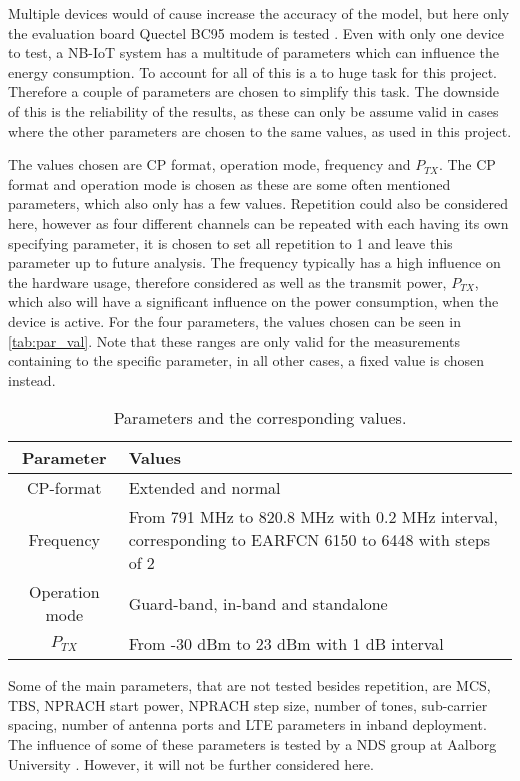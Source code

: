 Multiple devices would of cause increase the accuracy of the model, but here only the evaluation board Quectel BC95 modem is tested \citep{BC95}. Even with only one device to test, a \gls{NB-IoT} system has a multitude of parameters which can influence the energy consumption. To account for all of this is a to huge task for this project. Therefore a couple of parameters are chosen to simplify this task. The downside of this is the reliability of the results, as these can only be assume valid in cases where the other parameters are chosen to the same values, as used in this project. 

The values chosen are CP format, operation mode, frequency and $P_{TX}$. The CP format and operation mode is chosen as these are some often mentioned parameters, which also only has a few values. Repetition could also be considered here, however as four different channels can be repeated with each having its own specifying parameter, it is chosen to set all repetition to 1 and leave this parameter up to future analysis. The frequency typically has a high influence on the hardware usage, therefore considered as well as the transmit power, $P_{TX}$, which also will have a significant influence on the power consumption, when the device is active. For the four parameters, the values chosen can be seen in \autoref{tab:par_val}. Note that these ranges are only valid for the measurements containing to the specific parameter, in all other cases, a fixed value is chosen instead.

\begin{table}[H]
\centering
\begin{tabular}{|c|p{8cm}|} \hline
\textbf{Parameter} & \textbf{Values} \\ \hline
CP-format & Extended and normal\\ \hline
Frequency & From 791 MHz to 820.8 MHz with 0.2 MHz interval, corresponding to EARFCN 6150 to 6448 with steps of 2 \\ \hline
Operation mode & Guard-band, in-band and standalone \\ \hline
$P_{TX}$ & From -30 dBm to 23 dBm with 1 dB interval \\ \hline
\end{tabular}
\caption{Parameters and the corresponding values.}
\label{tab:par_val}
\end{table}

Some of the main parameters, that are not tested besides repetition, are \gls{MCS}, \gls{TBS}, NPRACH start power, NPRACH step size, number of tones, sub-carrier spacing, number of antenna ports and LTE parameters in inband deployment. The influence of some of these parameters is tested by a NDS group at Aalborg University \citep{NDS_report}. However, it will not be further considered here.

